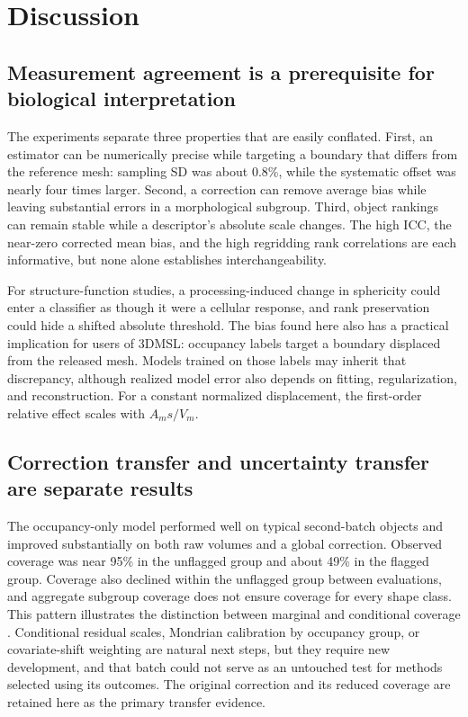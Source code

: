 \documentclass[journal]{IEEEtran}
\begin{document}
\section{Discussion}

\subsection{Measurement agreement is a prerequisite for biological interpretation}

The experiments separate three properties that are easily conflated. First, an estimator can be numerically precise while targeting a boundary that differs from the reference mesh: sampling SD was about 0.8\%, while the systematic offset was nearly four times larger. Second, a correction can remove average bias while leaving substantial errors in a morphological subgroup. Third, object rankings can remain stable while a descriptor's absolute scale changes. The high ICC, the near-zero corrected mean bias, and the high regridding rank correlations are each informative, but none alone establishes interchangeability.

For structure-function studies, a processing-induced change in sphericity could enter a classifier as though it were a cellular response, and rank preservation could hide a shifted absolute threshold. The bias found here also has a practical implication for users of 3DMSL: occupancy labels target a boundary displaced from the released mesh. Models trained on those labels may inherit that discrepancy, although realized model error also depends on fitting, regularization, and reconstruction. For a constant normalized displacement, the first-order relative effect scales with $A_ms/V_m$.

\subsection{Correction transfer and uncertainty transfer are separate results}

The occupancy-only model performed well on typical second-batch objects and improved substantially on both raw volumes and a global correction. Observed coverage was near 95\% in the unflagged group and about 49\% in the flagged group. Coverage also declined within the unflagged group between evaluations, and aggregate subgroup coverage does not ensure coverage for every shape class. This pattern illustrates the distinction between marginal and conditional coverage \cite{ref29}. Conditional residual scales, Mondrian calibration by occupancy group, or covariate-shift weighting \cite{ref28} are natural next steps, but they require new development, and that batch could not serve as an untouched test for methods selected using its outcomes. The original correction and its reduced coverage are retained here as the primary transfer evidence.
\end{document}
